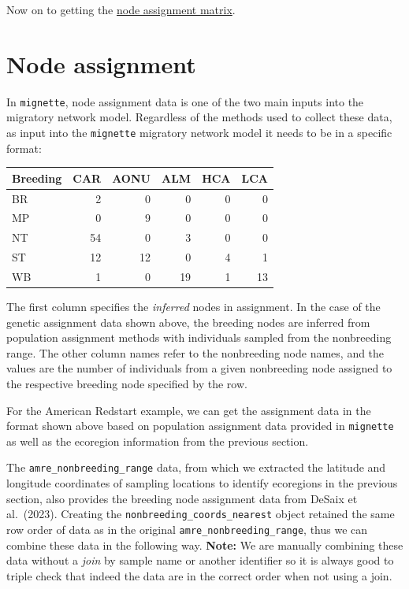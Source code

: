 \documentclass[
]{book}
\begin{document}
Now on to getting the \protect\hyperlink{assignment}{node assignment matrix}.

\hypertarget{assignment}{%
\chapter{Node assignment}\label{assignment}}

In \texttt{mignette}, node assignment data is one of the two main inputs into the migratory network model. Regardless of the methods used to collect these data, as input into the \texttt{mignette} migratory network model it needs to be in a specific format:

\begin{tabular}{l|r|r|r|r|r}
\hline
Breeding & CAR & AONU & ALM & HCA & LCA\\
\hline
BR & 2 & 0 & 0 & 0 & 0\\
\hline
MP & 0 & 9 & 0 & 0 & 0\\
\hline
NT & 54 & 0 & 3 & 0 & 0\\
\hline
ST & 12 & 12 & 0 & 4 & 1\\
\hline
WB & 1 & 0 & 19 & 1 & 13\\
\hline
\end{tabular}

The first column specifies the \emph{inferred} nodes in assignment. In the case of the genetic assignment data shown above, the breeding nodes are inferred from population assignment methods with individuals sampled from the nonbreeding range. The other column names refer to the nonbreeding node names, and the values are the number of individuals from a given nonbreeding node assigned to the respective breeding node specified by the row.

For the American Redstart example, we can get the assignment data in the format shown above based on population assignment data provided in \texttt{mignette} as well as the ecoregion information from the previous section.

The \texttt{amre\_nonbreeding\_range} data, from which we extracted the latitude and longitude coordinates of sampling locations to identify ecoregions in the previous section, also provides the breeding node assignment data from DeSaix et al.~(2023). Creating the \texttt{nonbreeding\_coords\_nearest} object retained the same row order of data as in the original \texttt{amre\_nonbreeding\_range}, thus we can combine these data in the following way. \textbf{Note:} We are manually combining these data without a \emph{join} by sample name or another identifier so it is always good to triple check that indeed the data are in the correct order when not using a join.
\end{document}
